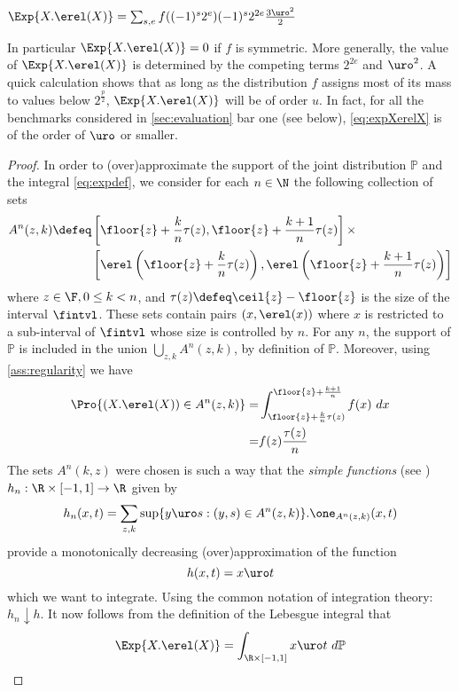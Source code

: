 \begin{proposition}\label{prop:expXerelX}$\Exp{X.\erel(X)} = \sum_{s,e} f((-1)^s2^e)(-1)^s2^{2e}\frac{3\uro^2}{2}$
\end{proposition}
In particular $\Exp{X.\erel(X)}=0$ if $f$ is symmetric. More generally, the value of $\Exp{X.\erel(X)}$ is determined by the competing terms $2^{2e}$ and $\uro^2$. A quick calculation shows that as long as the distribution $f$ assigns most of its mass to values below $2^{\frac{p}{2}}$, $\Exp{X.\erel(X)}$ will be of order $u$. In fact, for all the benchmarks considered in \cref{sec:evaluation} bar one (see below), \cref{eq:expXerelX} is of the order of $\uro$ or smaller.
\begin{proof}
In order to (over)approximate the support of the joint distribution $\mathbb{P}$ and the integral \cref{eq:expdef}, we consider for each $n\in\N$ the following collection of sets
\begin{align*}
A^n(z,k) \defeq &\left[\floor{z}+\frac{k}{n}\tau(z), \floor{z}+\frac{k+1}{n}\tau(z)\right]\times \\
&\left[\erel\left(\floor{z}+\frac{k}{n}\tau(z)\right), \erel\left(\floor{z}+\frac{k+1}{n}\tau(z)\right)\right]
\end{align*}
where $z\in \F, 0\leq k < n$, and $\tau(z)\defeq \ceil{z}-\floor{z}$ is the size of the interval $\fintvl$. These sets contain pairs $(x,\erel(x))$ where $x$ is restricted to a sub-interval of $\fintvl$ whose size is controlled by $n$. For any $n$, the support of $\mathbb{P}$ is included in the union $\bigcup_{z,k}A^n(z,k)$, by definition of $\mathbb{P}$. Moreover, using \cref{ass:regularity} we have
\begin{align*}
\Pro{(X.\erel(X))\in A^n(z,k)} = & \int_{\floor{z}+\frac{k}{n}\tau(z)}^{\floor{z}+\frac{k+1}{n}} f(x)~dx\\
= & f(z) \frac{\tau(z)}{n}
\end{align*}
The sets $A^n(k,z)$ were chosen is such a way that the \emph{simple functions} (see \cite{dudley2002real}) $h_n: \R\times [-1,1]\to\R$ given by
\[
h_n(x,t) = \sum_{z,k} \sup\{y\uro s : (y,s)\in A^n(z,k)\} .\one_{A^n(z,k)}(x,t)
\]
provide a monotonically decreasing (over)approximation of the function
\[
h(x,t) = x\uro t
\]
which we want to integrate. Using the common notation of integration theory: $h_n \downarrow h$. It now follows from the definition of the Lebesgue integral that
\begin{align*}
\Exp{X.\erel(X)} & = \int_{\R\times [-1,1]} x\uro t~d\mathbb{P}\\

\end{align*}
\end{proof}
